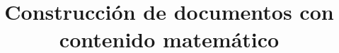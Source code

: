 \documentclass{doc}
\title{Construcción de documentos con contenido matemático}
\begin{document}
\makedocheader





\printbibliography
\end{document}

